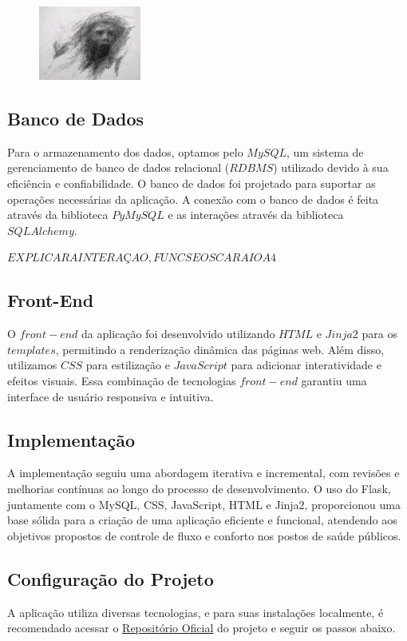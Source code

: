 \documentclass[conference, a4paper, 12pt]{IEEEtran}
\begin{document}
\begin{figure}[h]
  \begin{center}
    \includegraphics[width=0.30\textwidth]{schizo.jpeg}
  \end{center}
\end{figure}

\subsection{Banco de Dados}
Para o armazenamento dos dados, optamos pelo $MySQL$, um sistema de gerenciamento de banco de dados relacional ($RDBMS$) utilizado devido à sua eficiência e confiabilidade. O banco de dados foi projetado para suportar as operações necessárias da aplicação. A conexão com o banco de dados é feita através da biblioteca $PyMySQL$ e as interações através da biblioteca $SQLAlchemy$.

$EXPLICAR A INTERAÇAO, FUNCS E OS CARAIO A 4$

\subsection{Front-End}
O $front-end$ da aplicação foi desenvolvido utilizando $HTML$ e $Jinja2$ para os $templates$, permitindo a renderização dinâmica das páginas web. Além disso, utilizamos $CSS$ para estilização e $JavaScript$ para adicionar interatividade e efeitos visuais. Essa combinação de tecnologias $front-end$ garantiu uma interface de usuário responsiva e intuitiva.

\subsection{Implementação}
A implementação seguiu uma abordagem iterativa e incremental, com revisões e melhorias contínuas ao longo do processo de desenvolvimento. O uso do Flask, juntamente com o MySQL, CSS, JavaScript, HTML e Jinja2, proporcionou uma base sólida para a criação de uma aplicação eficiente e funcional, atendendo aos objetivos propostos de controle de fluxo e conforto nos postos de saúde públicos.

\subsection{Configuração do Projeto}
A aplicação utiliza diversas tecnologias, e para suas instalações localmente, é recomendado acessar o \href{https://github.com/Lucas-LPG/gws}{Repositório Oficial} do projeto e seguir os passos abaixo.
\end{document}
